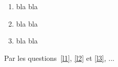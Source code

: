 \documentclass{article}
\begin{document}
\begin{enumerate}
	\item\label{l1} bla bla
	\item\label{l2} bla bla
	\item\label{l3} bla bla
\end{enumerate}

Par les questions~\ref{l1}, \ref{l2} et \ref{l3}, ...
\end{document}
